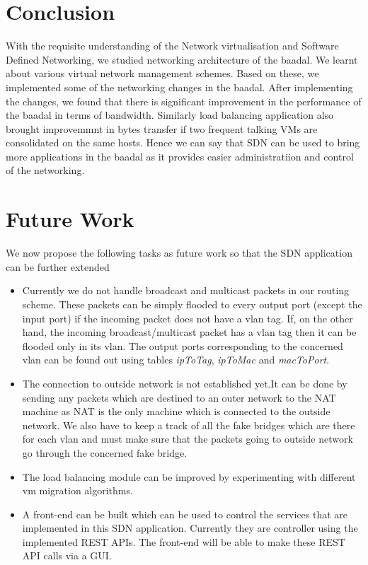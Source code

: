 \section{Conclusion}
With the requisite understanding of the Network virtualisation and Software Defined Networking, we studied networking architecture of the baadal. We learnt about various virtual network management schemes. Based on these, we implemented some of the networking changes in the baadal. After implementing the changes, we found that there is significant improvement in the performance of the baadal in terms of bandwidth. Similarly load balancing application also brought improvemmnt in bytes transfer if two frequent talking VMs are consolidated on the same hosts. Hence we can say that SDN can be used to bring more applications in the baadal as it provides easier administratiion and control of the networking. 
\section{Future Work}
We now propose the following tasks as future work so that the SDN application can be further extended
\begin{itemize}
    \item Currently we do not handle broadcast and multicast packets in our routing scheme. These packets can be simply flooded to every output port (except the input port) if the incoming packet does not have a vlan tag. If, on the other hand, the incoming broadcast/multicast packet has a vlan tag then it can be flooded only in its vlan. The output ports corresponding to the concerned vlan can be found out using tables \textit{ipToTag}, \textit{ipToMac} and \textit{macToPort}.
    \item The connection to outside network is not established yet.It can be done by sending any packets which are destined to an outer network to the NAT machine as NAT is the only machine which is connected to the outside network. We also have to keep a track of all the fake bridges which are there for each vlan and must make sure that the packets going to outside network go through the concerned fake bridge.
    \item The load balancing module can be improved by experimenting with different vm migration algorithms.
    \item A front-end can be built which can be used to control the services that are implemented in this SDN application. Currently they are controller using the implemented REST APIs. The front-end will be able to make these REST API calls via a GUI.
\end{itemize}